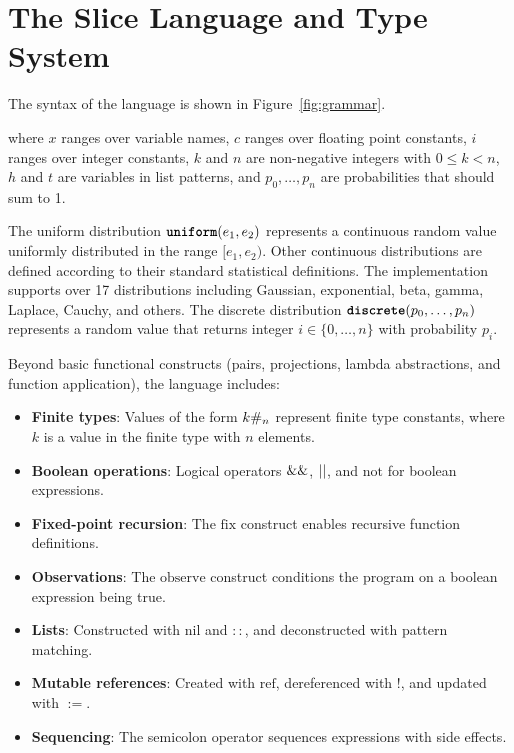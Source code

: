 \section{The Slice Language and Type System}\label{sec:language}

The syntax of the \Slice{} language is shown in Figure~\ref{fig:grammar}.



\noindent where $x$ ranges over variable names, $c$ ranges over floating point constants, $i$ ranges over integer constants, $k$ and $n$ are non-negative integers with $0 \leq k < n$, $h$ and $t$ are variables in list patterns, and $p_0, \ldots, p_n$ are probabilities that should sum to 1.

The uniform distribution $\text{\ttfamily\bfseries uniform}(e_1, e_2)$ represents a continuous random value uniformly distributed in the range $[e_1, e_2)$. Other continuous distributions are defined according to their standard statistical definitions. The implementation supports over 17 distributions including Gaussian, exponential, beta, gamma, Laplace, Cauchy, and others. The discrete distribution $\text{\ttfamily\bfseries discrete}(p_0, \ldots, p_{n})$ represents a random value that returns integer $i \in \{0, \ldots, n\}$ with probability $p_i$.

Beyond basic functional constructs (pairs, projections, lambda abstractions, and function application), the language includes:
\begin{itemize}
\item \textbf{Finite types}: Values of the form $k\#_{n}$ represent finite type constants, where $k$ is a value in the finite type with $n$ elements.
\item \textbf{Boolean operations}: Logical operators $\mathrel{\&\&}$, $\mathrel{||}$, and $\text{not}$ for boolean expressions.
\item \textbf{Fixed-point recursion}: The $\text{fix}$ construct enables recursive function definitions.
\item \textbf{Observations}: The $\text{observe}$ construct conditions the program on a boolean expression being true.
\item \textbf{Lists}: Constructed with $\text{nil}$ and $::$, and deconstructed with pattern matching.
\item \textbf{Mutable references}: Created with $\text{ref}$, dereferenced with $!$, and updated with $:=$.
\item \textbf{Sequencing}: The semicolon operator sequences expressions with side effects.
\end{itemize}

